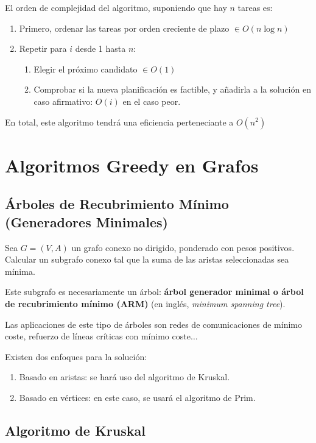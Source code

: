 \documentclass[10pt,a4paper,spanish]{report}
\theoremstyle{definition}
\theoremstyle{remark}
\begin{document}
El orden de complejidad del algoritmo, suponiendo que hay $n$ tareas es:
\begin{enumerate}[---]
    \item Primero, ordenar las tareas por orden creciente de plazo $\in O(n\log n)$
    \item Repetir para $i$ desde 1 hasta $n$:
    \begin{enumerate}[$\bullet$]
        \item Elegir el próximo candidato $\in O(1)$
        \item Comprobar si la nueva planificación es factible, y añadirla a la solución en caso afirmativo: $O(i)$ en el caso peor.
    \end{enumerate}
\end{enumerate}
En total, este algoritmo tendrá una eficiencia perteneciante a $O(n^2)$

\section{\textcolor{electriccrimson}Algoritmos Greedy en Grafos}

\subsection{\textcolor{electriccrimson}{Á}rboles de Recubrimiento Mínimo (Generadores Minimales)}

Sea $G=(V,A)$ un grafo conexo no dirigido, ponderado con pesos positivos. Calcular un subgrafo conexo tal que la suma de las aristas seleccionadas sea mínima. 

Este subgrafo es necesariamente un árbol: \textbf{\textcolor{electriccrimson}{árbol generador minimal o árbol de recubrimiento mínimo (ARM)}} (en inglés, \textit{minimum spanning tree}).

Las aplicaciones de este tipo de árboles son redes de comunicaciones de mínimo coste, refuerzo de líneas críticas con mínimo coste$\ldots$

Existen dos enfoques para la solución:
\begin{enumerate}[\textcolor{electriccrimson}{$\bullet$}]
    \item Basado en aristas: se hará uso del algoritmo de Kruskal.
    \item Basado en vértices: en este caso, se usará el algoritmo de Prim.
\end{enumerate}

\subsection{\textcolor{electriccrimson}Algoritmo de Kruskal}
\label{kruskal}
\end{document}
